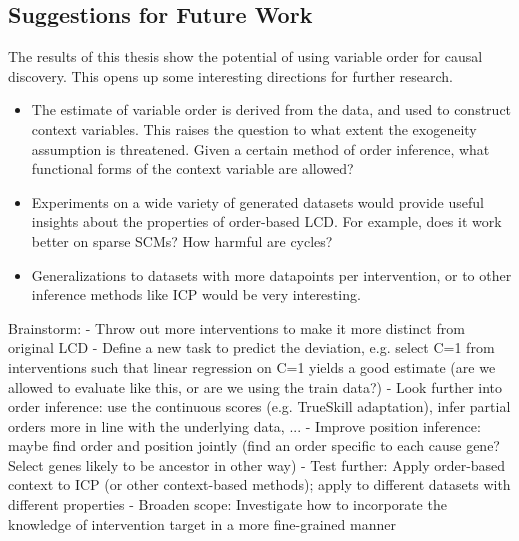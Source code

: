\subsection{Suggestions for Future Work}
The results of this thesis show the potential of using variable order for causal discovery. This opens up some interesting directions for further research.

\begin{itemize}
    \item The estimate of variable order is derived from the data, and used to construct context variables. This raises the question to what extent the exogeneity assumption is threatened. Given a certain method of order inference, what functional forms of the context variable are allowed?
    \item Experiments on a wide variety of generated datasets would provide useful insights about the properties of order-based LCD. For example, does it work better on sparse SCMs? How harmful are cycles?
    \item Generalizations to datasets with more datapoints per intervention, or to other inference methods like ICP would be very interesting. 
\end{itemize}

Brainstorm:
- Throw out more interventions to make it more distinct from original LCD
- Define a new task to predict the deviation, e.g. select C=1 from interventions such that linear regression on C=1 yields a good estimate (are we allowed to evaluate like this, or are we using the train data?)
- Look further into order inference: use the continuous scores (e.g. TrueSkill adaptation), infer partial orders more in line with the underlying data, ...
- Improve position inference: maybe find order and position jointly (find an order specific to each cause gene? Select genes likely to be ancestor in other way)
- Test further: Apply order-based context to ICP (or other context-based methods); apply to different datasets with different properties
- Broaden scope: Investigate how to incorporate the knowledge of intervention target in a more fine-grained manner



